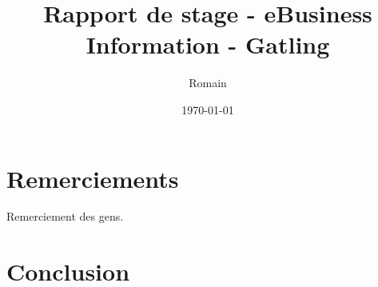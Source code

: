 \documentclass[12pt]{book}
\title{Rapport de stage - eBusiness Information - Gatling}
\author{Romain \bsc{Sertelon}}
\date{\today}
\begin{document}


\frontmatter

\chapter{Remerciements}
Remerciement des gens.
  
\tableofcontents


\mainmatter








  
\chapter{Conclusion}
  
\end{document}
